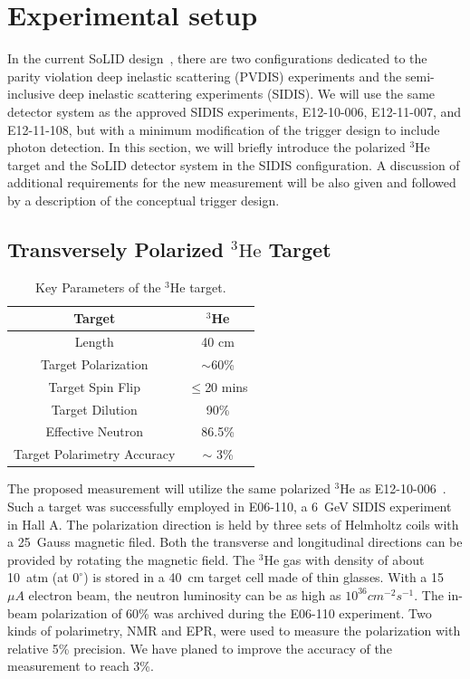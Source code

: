 \section {Experimental setup}
 In the current SoLID design~\cite{solid_pcdr}, there are two configurations dedicated to the parity violation deep inelastic scattering (PVDIS) experiments and the semi-inclusive deep inelastic scattering experiments (SIDIS). We will use the same detector system as the approved SIDIS experiments, E12-10-006, E12-11-007, and E12-11-108, but with a minimum modification of the trigger design to include photon detection. In this section, we will briefly introduce the polarized $\mathrm{^{3}He}$ target and the SoLID detector system in the SIDIS configuration. A discussion of additional requirements for the new measurement will be also given and followed by a description of the conceptual trigger design. 
 
\subsection {Transversely Polarized $\mathrm{^{3}He}$ Target}
\begin{table}[!ht]
\centering
\begin{tabular}{|c|c|}
\hline
Target                       & $^3$He              \\\hline 
Length                       & 40 cm               \\\hline          
Target Polarization          & $\sim$60\%          \\\hline 
Target Spin Flip             & $\leq$20 mins       \\\hline 
Target Dilution              & 90\%  \\\hline
Effective Neutron            & 86.5\%  \\\hline
Target Polarimetry Accuracy  & $\sim$ 3\%          \\\hline
\end{tabular}
\caption{\footnotesize{Key Parameters of the $\mathrm{^{3}He}$ target.}}\label{table:target}
\end{table} 
The proposed measurement will utilize the same polarized $\mathrm{^{3}He}$ as E12-10-006~\cite{e12-10-006}. Such a target was successfully employed in E06-110, a 6~GeV SIDIS experiment in Hall A. The polarization direction is held by three sets of Helmholtz coils with a 25~Gauss magnetic filed. Both the transverse and longitudinal directions can be provided by rotating the magnetic field. The $\mathrm{^{3}He}$ gas with density of about 10~atm (at $0^{\circ}$) is stored in a 40~cm target cell made of thin glasses. With a 15~$\mu A$ electron beam, the neutron luminosity can be as high as $10^{36} cm^{-2}s^{-1}$. The in-beam polarization of 60\% was archived during the E06-110 experiment. Two kinds of polarimetry, NMR and EPR, were used to measure the polarization with relative 5\% precision. We have planed to improve the accuracy of the measurement to reach 3\%.

